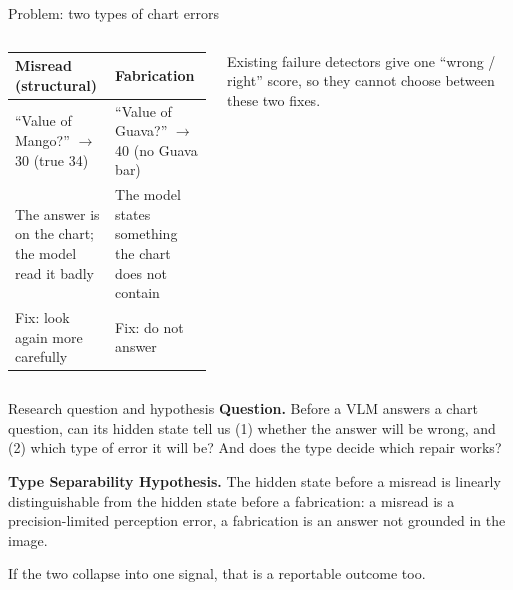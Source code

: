 \documentclass[10pt,aspectratio=169]{beamer}
\begin{document}
\begin{frame}{Problem: two types of chart errors}
\begin{columns}[c]
\small
\begin{tabular}{L{0.42\linewidth}L{0.46\linewidth}}
\toprule
\textbf{Misread (structural)} & \textbf{Fabrication} \\
\midrule
``Value of Mango?'' $\to$ \alert{30} (true 34) & ``Value of Guava?'' $\to$ \alert{40} (no Guava bar) \\
The answer is on the chart; the model read it badly &
The model states something the chart does not contain \\
Fix: look again more carefully & Fix: do not answer \\
\bottomrule
\end{tabular}
\vspace{0.6em}

Existing failure detectors give one ``wrong / right'' score, so they cannot
choose between these two fixes.
\end{columns}
\end{frame}

\begin{frame}{Research question and hypothesis}
\textbf{Question.} Before a VLM answers a chart question, can its hidden state tell
us (1) whether the answer will be wrong, and (2) which type of error it will be?
And does the type decide which repair works?
\vspace{0.8em}

\textbf{Type Separability Hypothesis.} The hidden state before a misread is
linearly distinguishable from the hidden state before a fabrication: a misread is
a precision-limited perception error, a fabrication is an answer not grounded in
the image.
\vspace{0.8em}

If the two collapse into one signal, that is a reportable outcome too.
\end{frame}
\end{document}
